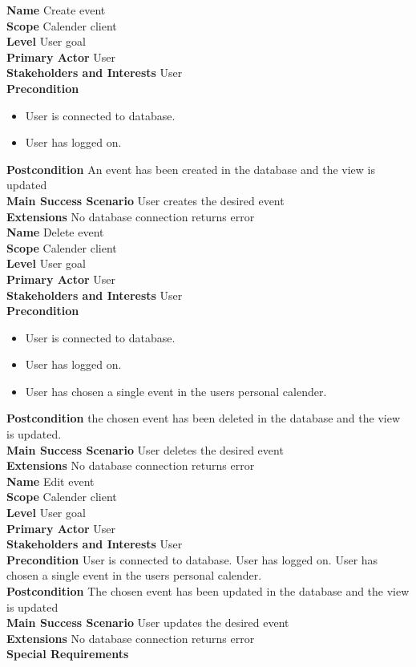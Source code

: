 \documentclass[a4paper,10pt,titlepage]{article}
\begin{document}
	\textbf{Name}
	Create event
	\\
	\textbf{Scope}
	Calender client
	\\
	\textbf{Level}
	User goal
	\\
	\textbf{Primary Actor}
	User
	\\
	\textbf{Stakeholders and Interests}
	User
	\\
	\textbf{Precondition}
		\begin{itemize}
		\item User is connected to database.
		\item User has logged on.
		\\
		\end{itemize}
	\textbf{Postcondition}
	An event has been created in the database and the view is updated
	\\
	\textbf{Main Success Scenario}
	User creates the desired event
	\\
	\textbf{Extensions}
	No database connection returns error
	\\
	
	\textbf{Name}
	Delete event
	\\
	\textbf{Scope}
	Calender client
	\\
	\textbf{Level}
	User goal
	\\
	\textbf{Primary Actor}
	User
	\\
	\textbf{Stakeholders and Interests}
	User
	\\
	\textbf{Precondition}
			\begin{itemize}
			\item User is connected to database.
			\item User has logged on.
			\item User has chosen a single event in the users personal calender.
			\\
			\end{itemize}
	\textbf{Postcondition}
	the chosen event has been deleted in the database and the view is updated.
	\\
	\textbf{Main Success Scenario}
	User deletes the desired event
	\\
	\textbf{Extensions}
	No database connection returns error
	\\
	
	\textbf{Name}
	Edit event
	\\
	\textbf{Scope}
	Calender client
	\\
	\textbf{Level}
	User goal
	\\
	\textbf{Primary Actor}
	User
	\\
	\textbf{Stakeholders and Interests}
	User
	\\
	\textbf{Precondition}
	User is connected to database.
	User has logged on.
	User has chosen a single event in the users personal calender.
	\\
	\textbf{Postcondition}
	The chosen event has been updated in the database and the view is updated
	\\
	\textbf{Main Success Scenario}
	User updates the desired event
	\\
	\textbf{Extensions}
	No database connection returns error
	\\
	\textbf{Special Requirements}
	\\
	
\end{document}
